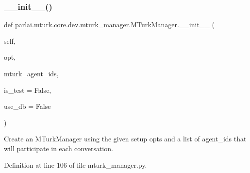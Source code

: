\subsubsection{\texorpdfstring{\+\_\+\+\_\+init\+\_\+\+\_\+()}{\_\_init\_\_()}}
{\footnotesize\ttfamily def parlai.\+mturk.\+core.\+dev.\+mturk\+\_\+manager.\+M\+Turk\+Manager.\+\_\+\+\_\+init\+\_\+\+\_\+ (\begin{DoxyParamCaption}\item[{}]{self,  }\item[{}]{opt,  }\item[{}]{mturk\+\_\+agent\+\_\+ids,  }\item[{}]{is\+\_\+test = {\ttfamily False},  }\item[{}]{use\+\_\+db = {\ttfamily False} }\end{DoxyParamCaption})}

\begin{DoxyVerb}Create an MTurkManager using the given setup opts and a list of agent_ids that
will participate in each conversation.
\end{DoxyVerb}
 

Definition at line 106 of file mturk\+\_\+manager.\+py.


